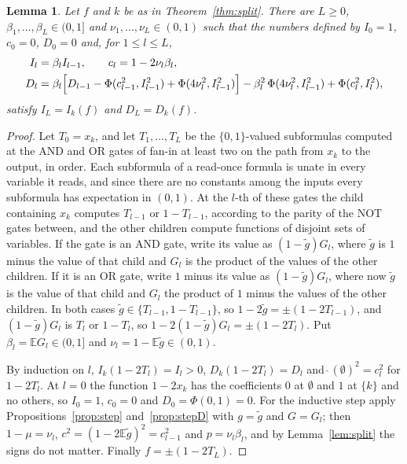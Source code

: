 \documentclass[11pt]{amsart}
\newtheorem{lemma}[theorem]{Lemma}
\theoremstyle{definition}\newtheorem{definition}[theorem]{Definition}
\theoremstyle{remark}\newtheorem{remark}[theorem]{Remark}
\newcommand{\E}{\mathbb{E}}
\begin{document}
\begin{lemma}\label{lem:path}
Let $f$ and $k$ be as in Theorem~\ref{thm:split}. There are $L\ge0$, $\beta_1,\dots,\beta_L\in(0,1]$ and
$\nu_1,\dots,\nu_L\in(0,1)$ such that the numbers defined by $I_0=1$, $c_0=0$, $D_0=0$ and, for $1\le l\le L$,
\begin{align*}
I_l&=\beta_lI_{l-1},\qquad c_l=1-2\nu_l\beta_l,\\
D_l&=\beta_l\Bigl[D_{l-1}-\Phi(c_{l-1}^2,I_{l-1}^2)+\Phi(4\nu_l^2,I_{l-1}^2)\Bigr]-\beta_l^2\,\Phi(4\nu_l^2,I_{l-1}^2)
+\Phi(c_l^2,I_l^2),
\end{align*}
satisfy $I_L=I_k(f)$ and $D_L=D_k(f)$.
\end{lemma}

\begin{proof}
Let $T_0=x_k$, and let $T_1,\dots,T_L$ be the $\{0,1\}$-valued subformulas computed at the AND and OR gates of fan-in
at least two on the path from $x_k$ to the output, in order. Each subformula of a read-once formula is unate in every
variable it reads, and since there are no constants among the inputs every subformula has expectation in $(0,1)$.
At the $l$-th of these gates the child containing $x_k$ computes $T_{l-1}$ or $1-T_{l-1}$, according to the parity
of the NOT gates between, and the other children compute functions of disjoint sets of variables. If the gate is an
AND gate, write its value as $(1-\tilde g)G_l$, where $\tilde g$ is $1$ minus the value of that child and $G_l$ is the
product of the values of the other children. If it is an OR gate, write $1$ minus its value as $(1-\tilde g)G_l$,
where now $\tilde g$ is the value of that child and $G_l$ the product of $1$ minus the values of the other children.
In both cases $\tilde g\in\{T_{l-1},1-T_{l-1}\}$, so $1-2\tilde g=\pm(1-2T_{l-1})$, and $(1-\tilde g)G_l$ is $T_l$ or
$1-T_l$, so $1-2(1-\tilde g)G_l=\pm(1-2T_l)$. Put $\beta_l=\E G_l\in(0,1]$ and $\nu_l=1-\E\tilde g\in(0,1)$.

By induction on $l$, $I_k(1-2T_l)=I_l>0$, $D_k(1-2T_l)=D_l$ and $\widehat{\ }(\emptyset)^2=c_l^2$ for $1-2T_l$. At
$l=0$ the function $1-2x_k$ has the coefficients $0$ at $\emptyset$ and $1$ at $\{k\}$ and no others, so
$I_0=1$, $c_0=0$ and $D_0=\Phi(0,1)=0$. For the inductive step apply Propositions~\ref{prop:step}
and~\ref{prop:stepD} with $g=\tilde g$ and $G=G_l$; then $1-\mu=\nu_l$, $c^2=(1-2\E\tilde g)^2=c_{l-1}^2$ and
$p=\nu_l\beta_l$, and by Lemma~\ref{lem:split} the signs do not matter. Finally $f=\pm(1-2T_L)$.
\end{proof}
\end{document}
